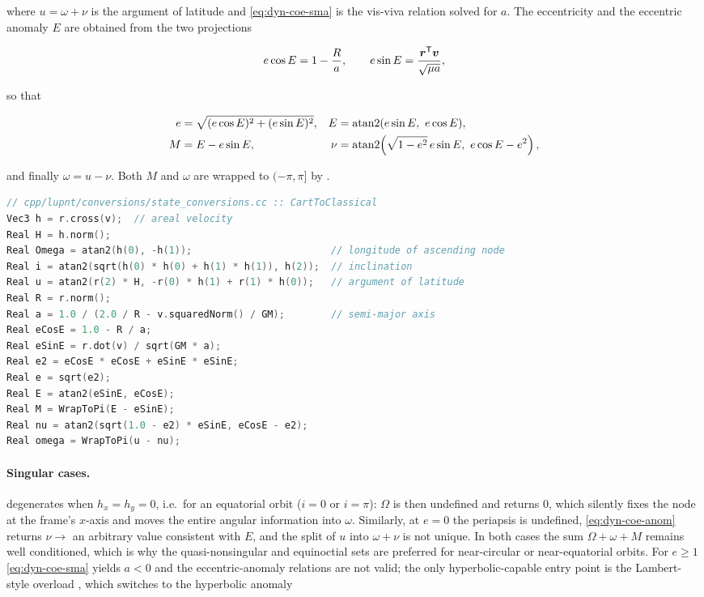 where $u=\omega+\nu$ is the argument of latitude and \cref{eq:dyn-coe-sma} is the
vis-viva relation solved for $a$. The eccentricity and the eccentric anomaly $E$
are obtained from the two projections

\begin{equation}
  \label{eq:dyn-coe-ecosE}
  e\cos E = 1 - \frac{R}{a},
  \qquad
  e\sin E = \frac{\bm{r}^{\mathsf{T}}\bm{v}}{\sqrt{\mu a}},
\end{equation}

so that

\begin{align}
  e &= \sqrt{(e\cos E)^2 + (e\sin E)^2}, & E &= \operatorname{atan2}(e\sin E,\ e\cos E), \label{eq:dyn-coe-ecc}\\
  M &= E - e\sin E, & \nu &= \operatorname{atan2}\!\left(\sqrt{1-e^2}\,e\sin E,\ e\cos E - e^2\right), \label{eq:dyn-coe-anom}
\end{align}

and finally $\omega = u - \nu$. Both $M$ and $\omega$ are wrapped to
$(-\pi,\pi]$ by .

\begin{lstlisting}[language=cpp, caption={Cartesian to classical elements.}, label={lst:dyn-cart2coe}]
// cpp/lupnt/conversions/state_conversions.cc :: CartToClassical
Vec3 h = r.cross(v);  // areal velocity
Real H = h.norm();
Real Omega = atan2(h(0), -h(1));                        // longitude of ascending node
Real i = atan2(sqrt(h(0) * h(0) + h(1) * h(1)), h(2));  // inclination
Real u = atan2(r(2) * H, -r(0) * h(1) + r(1) * h(0));   // argument of latitude
Real R = r.norm();
Real a = 1.0 / (2.0 / R - v.squaredNorm() / GM);        // semi-major axis
Real eCosE = 1.0 - R / a;
Real eSinE = r.dot(v) / sqrt(GM * a);
Real e2 = eCosE * eCosE + eSinE * eSinE;
Real e = sqrt(e2);
Real E = atan2(eSinE, eCosE);
Real M = WrapToPi(E - eSinE);
Real nu = atan2(sqrt(1.0 - e2) * eSinE, eCosE - e2);
Real omega = WrapToPi(u - nu);
\end{lstlisting}

\paragraph{Singular cases.}
 degenerates when $h_x=h_y=0$, i.e.\ for an equatorial
orbit ($i=0$ or $i=\pi$): $\Omega$ is then undefined and 
returns $0$, which silently fixes the node at the frame's $x$-axis and moves the
entire angular information into $\omega$. Similarly, at $e=0$ the periapsis is
undefined, \cref{eq:dyn-coe-anom} returns $\nu\to$ an arbitrary value consistent
with $E$, and the split of $u$ into $\omega+\nu$ is not unique. In both cases the
sum $\Omega+\omega+M$ remains well conditioned, which is why the quasi-nonsingular
and equinoctial sets are preferred for near-circular or near-equatorial orbits.
For $e\ge 1$ \cref{eq:dyn-coe-sma} yields $a<0$ and the eccentric-anomaly
relations are not valid; the only hyperbolic-capable entry point is the
Lambert-style overload , which switches to
the hyperbolic anomaly

